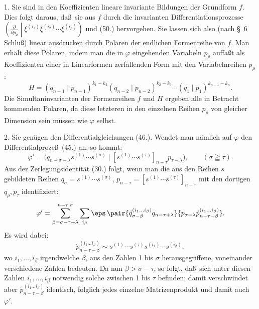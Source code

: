 1. Sie sind in den Koeffizienten lineare invariante Bildungen der Grundform $f$. Dies folgt daraus, da\ss\ sie aus $f$ durch die invarianten Differentiationsprozesse $\left(\frac{\partial}{\partial p_\rho}\middle|\xi^{(i_1)}\xi^{(i_2)}\cdots\xi^{(i_\rho)}\right)$ und (50.) hervorgehen. Sie lassen sich also (nach \S\ 6 Schlu\ss) linear ausdr\"ucken durch Polaren der endlichen Formenreihe von $f$. Man erh\"alt diese Polaren, indem man die in $\varphi$ eingehenden Variabeln $p_\rho$ auffa\ss t als Koeffizienten einer in Linearformen zerfallenden Form mit den Variabelnreihen $p_\rho$:
\begin{equation}
 H=(q_{n-1}\mid p_{n-1})^{k_1-k_2}(q_{n-2}\mid p_{n-2})^{k_2-k_3}\cdots(q_1\mid p_1)^{k_{n-1}-k_n}.
\tag{52}
\end{equation}
Die Simultaninvarianten der Formenreihen $f$ und $H$ ergeben alle in Betracht kommenden Polaren, da diese letzteren in den einzelnen Reihen $p_\rho$ von gleicher Dimension sein m\"ussen wie $\varphi$ selbst.

2. Sie gen\"ugen den Differentialgleichungen (46.). Wendet man n\"amlich auf $\varphi$ den Differentialproze\ss\ (45.) an, so kommt:
\[
 \varphi'=\bigl(q_{n-\sigma-\lambda}s^{(1)}\cdots s^{(\sigma)}\mid [s^{(1)}\cdots s^{(\tau)}]_{n-\tau}p_{\tau-\lambda}\bigr),\qquad (\sigma\geqq\tau).
\]
Aus der Zerlegungsidentit\"at (30.) folgt, wenn man die aus den Reihen $s$ gebildeten Reihen $q_\sigma=s^{(1)}\cdots s^{(\sigma)}$, $p_{n-\tau}=[s^{(1)}\cdots s^{(\tau)}]_{n-\tau}$ mit den dortigen $q_\rho,p_\tau$ identifiziert:
\[
 \varphi'=\sum_{\beta=\sigma-\tau+\lambda}^{n-\tau,\sigma}\sum_{i_\beta}\eps\,
 \pair{\dot{q}_{\sigma-\beta}^{(i_1\ldots i_\beta)}q_{n-\tau+\lambda}}{p_{\sigma+\lambda}\dot{p}_{n-\tau-\beta}^{(i_1\ldots i_\beta)}}.
\]
Es wird dabei:
\[
 \dot{p}_{n-\tau-\beta}^{(i_1\ldots i_\beta)}\sim s^{(1)}\cdots s^{(\tau)}s^{(i_1)}\cdots s^{(i_\beta)},
\]
wo $i_1,\ldots,i_\beta$ irgendwelche $\beta$, aus den Zahlen 1 bis $\sigma$ herausgegriffene, voneinander verschiedene Zahlen bedeuten. Da nun $\beta>\sigma-\tau$, so folgt, da\ss\ sich unter diesen Zahlen $i_1,\ldots,i_\beta$ notwendig solche zwischen 1 bis $\tau$ befinden; damit verschwindet aber $\dot{p}_{n-\tau-\beta}^{(i_1\ldots i_\beta)}$ identisch, folglich jedes einzelne Matrizenprodukt und damit auch $\varphi'$.

